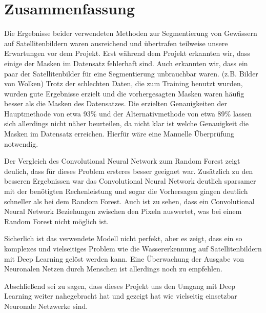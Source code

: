\section{Zusammenfassung}
\label{sec:Zusammenfassung}

Die Ergebnisse beider verwendeten Methoden zur Segmentierung von Gewässern auf Satellitenbildern waren ausreichend
und übertrafen teilweise unsere Erwartungen vor dem Projekt.
Erst während dem Projekt erkannten wir, dass einige der Masken im Datensatz fehlerhaft sind.
Auch erkannten wir, dass ein paar der Satellitenbilder für eine Segmentierung unbrauchbar waren. (z.B. Bilder von Wolken)
Trotz der schlechten Daten, die zum Training benutzt wurden, wurden gute Ergebnisse erzielt 
und die vorhergesagten Masken waren häufig besser als die Masken des Datensatzes.
Die erzielten Genauigkeiten der Hauptmethode von etwa 93\% und der Alternativmethode von etwa 89\% lassen sich allerdings nicht näher beurteilen, 
da nicht klar ist welche Genauigkeit die Masken im Datensatz erreichen.
Hierfür wäre eine Manuelle Überprüfung notwendig.

Der Vergleich des Convolutional Neural Network zum Random Forest zeigt deulich, dass für dieses Problem ersteres besser geeignet war.
Zusätzlich zu den besseren Ergebnissen war das Convolutional Neural Network deutlich sparsamer mit der benötigten Rechenleistung 
und sogar die Vorhersagen gingen deutlich schneller als bei dem Random Forest.
Auch ist zu sehen, dass ein Convolutional Neural Network Beziehungen zwischen den Pixeln auswertet, was bei einem Random Forest nicht möglich ist.

Sicherlich ist das verwendete Modell nicht perfekt, aber es zeigt, dass ein so komplexes und vielseitiges Problem 
wie die Wassererkennung auf Satellitenbildern mit Deep Learning gelöst werden kann.
Eine Überwachung der Ausgabe von Neuronalen Netzen durch Menschen ist allerdings noch zu empfehlen.

Abschließend sei zu sagen, dass dieses Projekt uns den Umgang mit Deep Learning weiter nahegebracht hat 
und gezeigt hat wie vielseitig einsetzbar Neuronale Netzwerke sind.
